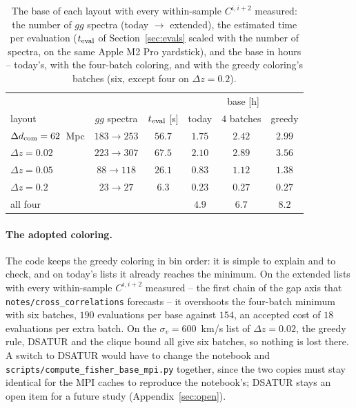 \documentclass[11pt]{article}
\newcommand{\us}{\_\allowbreak}
\begin{document}
\begin{table}[tbp]
  \centering
  \begin{tabular}{lccccc}
    \hline
    & & & \multicolumn{3}{c}{base [h]} \\
    layout & $gg$ spectra & $t_{\rm eval}$ [s] & today
      & $4$ batches & greedy \\
    \hline
    $\Delta d_{\rm com} = 62$~Mpc & $183 \to 253$ & $56.7$ & $1.75$
      & $2.42$ & $2.99$ \\
    $\Delta z = 0.02$ & $223 \to 307$ & $67.5$ & $2.10$
      & $2.89$ & $3.56$ \\
    $\Delta z = 0.05$ & $88 \to 118$ & $26.1$ & $0.83$
      & $1.12$ & $1.38$ \\
    $\Delta z = 0.2$ & $23 \to 27$ & $6.3$ & $0.23$
      & $0.27$ & $0.27$ \\
    \hline
    all four & & & $4.9$ & $6.7$ & $8.2$ \\
    \hline
  \end{tabular}
  \caption{The base of each layout with every within-sample
    $C^{i,i+2}$ measured: the number of $gg$ spectra (today $\to$
    extended), the estimated time per evaluation ($t_{\rm eval}$ of
    Section~\ref{sec:evals} scaled with the number of spectra, on the
    same Apple M2 Pro yardstick), and the base in hours -- today's,
    with the four-batch coloring, and with the greedy coloring's
    batches (six, except four on $\Delta z = 0.2$).}
  \label{tab:morecost}
\end{table}

\paragraph{The adopted coloring.}
The code keeps the greedy coloring in bin order: it is simple to
explain and to check, and on today's lists it already reaches the
minimum.  On the extended lists with every within-sample $C^{i,i+2}$
measured -- the first chain of the gap axis that
\texttt{notes/cross\us correlations} forecasts -- it overshoots the
four-batch minimum with six batches, $190$ evaluations per base
against $154$, an accepted cost of $18$ evaluations per extra batch.
On the $\sigma_v = 600$~km/s list of $\Delta z = 0.02$, the greedy
rule, DSATUR and the clique bound all give six batches, so nothing is
lost there.  A switch to DSATUR would have to change the notebook and
\texttt{scripts/compute\us fisher\us base\us mpi.py} together, since
the two copies must stay identical for the MPI caches to reproduce
the notebook's; DSATUR stays an open item for a future study
(Appendix~\ref{sec:open}).
\end{document}
